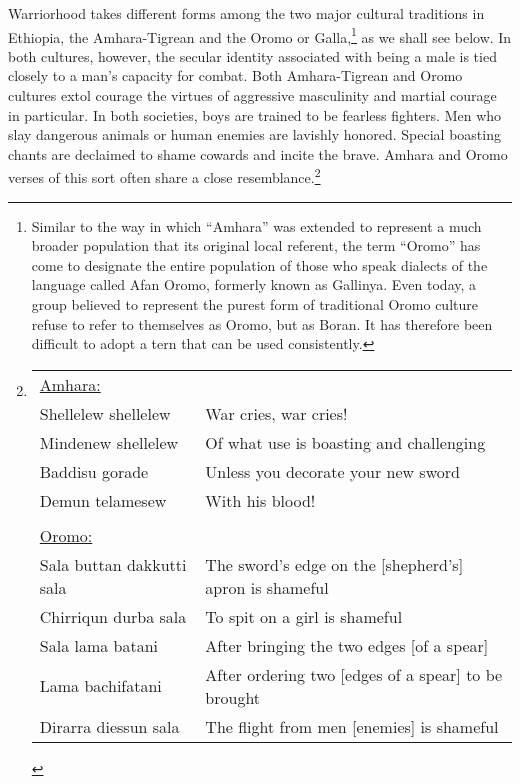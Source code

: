 Warriorhood takes different forms among the two major cultural traditions in Ethiopia, the Amhara-Tigrean and the Oromo or Galla,\footnote{Similar to the way in which ``Amhara'' was extended to represent a much broader population that its original local referent, the term ``Oromo'' has come to designate the entire population of those who speak dialects of the language called Afan Oromo, formerly known as Gallinya.  Even today, a group believed to represent the purest form of traditional Oromo culture refuse to refer to themselves as Oromo, but as Boran.  It has therefore been difficult to adopt a tern that can be used consistently.} as we shall see below. In both cultures, however, the secular identity associated with being a male is tied closely to a man's capacity for combat. Both Amhara-Tigrean and Oromo cultures extol courage the virtues of aggressive masculinity and martial courage in particular. In both societies, boys are trained to be fearless fighters. Men who slay dangerous animals or human enemies are lavishly honored. Special boasting chants are declaimed to shame cowards and incite the brave. Amhara and Oromo verses of this sort often share a close resemblance.\footnote{
\begin{tabular}[t]{ l l }
\underline{Amhara:} & \\
Shellelew shellelew & War cries, war cries! \\
Mindenew shellelew & Of what use is boasting and challenging \\
Baddisu gorade & Unless you decorate your new sword \\
Demun telamesew & With his blood! \\
 & \\
\underline{Oromo:} & \\
Sala buttan dakkutti sala & The sword’s edge on the [shepherd's] apron is shameful \\
Chirriqun durba sala & To spit on a girl is shameful \\
Sala lama batani & After bringing the two edges [of a spear] \\
Lama bachifatani & After ordering two [edges of a spear] to be brought \\
Dirarra diessun sala & The flight from men [enemies] is shameful
\end{tabular}
}


